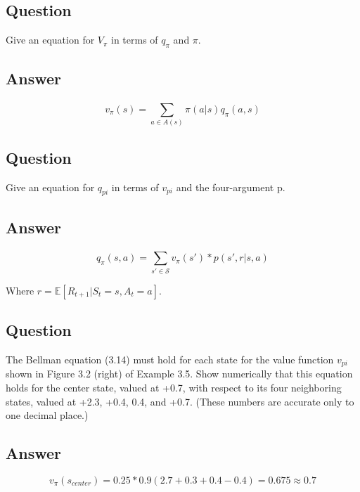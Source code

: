 \documentclass[11pt]{article}
\begin{document}
    \subsection{Question}

    Give an equation for $V_{\pi}$ in terms of $q_\pi$ and $\pi$.

    \subsection*{Answer}

    \begin{equation}
        v_{\pi}(s) = \sum_{a \in A(s)}^{} \pi(a|s)q_{\pi}(a,s)
    \end{equation}

    \subsection{Question}

    Give an equation for $q_{pi}$ in terms of $v_{pi}$ and the four-argument p.

    \subsection*{Answer}

    \begin{equation}
        q_{\pi}(s, a) = \sum_{s' \in \mathcal{S}}^{} v_{\pi}(s')*p(s', r | s, a)
    \end{equation}

    Where $r = \mathbb{E}[R_{t+1}|S_t = s, A_t = a]$.

    \subsection{Question}

    The Bellman equation (3.14) must hold for each state for the value function $v_{pi}$ shown in Figure 3.2 (right) of Example 3.5.
    Show numerically that this equation holds for the center state, valued at +0.7, with respect to its four neighboring states, valued at +2.3, +0.4, 0.4, and +0.7.
    (These numbers are accurate only to one decimal place.)

    \subsection*{Answer}

    \begin{equation}
        v_{\pi}(s_{center}) = 0.25 * 0.9 ( 2.7 + 0.3 + 0.4 -0.4 ) = 0.675 \approx 0.7
    \end{equation}
\end{document}

